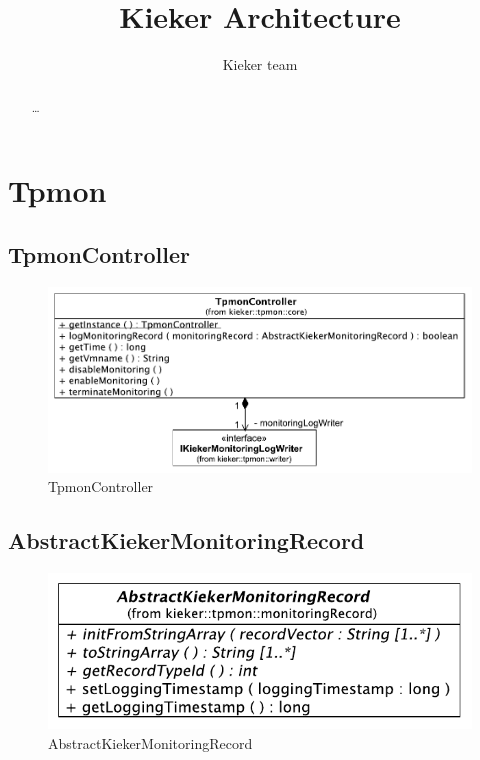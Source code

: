 \documentclass[12pt,journal,a4paper,twocolumn,final,oneside]{IEEEtran}%
\begin{document}
%

\setcounter{page}{1}

\title{%
Kieker Architecture%
}

\author{%
Kieker team
}

\maketitle

\begin{abstract}\small
\ldots
\end{abstract}

\section{Tpmon}

\subsection{TpmonController}

\begin{figure}[h]\centering
\includegraphics[scale=0.55]{figures/model/kieker_TpmonController}%
\caption{TpmonController}
\end{figure}
 
\subsection{AbstractKiekerMonitoringRecord}

\begin{figure}[h]\centering
\includegraphics[scale=0.55]{figures/model/kieker_AbstractKiekerMonitoringRecord}%
\caption{AbstractKiekerMonitoringRecord}
\end{figure}
\end{document}
